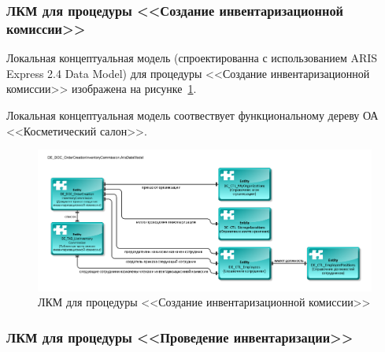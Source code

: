 \newpage

\subsubsection{ЛКМ для процедуры <<Создание инвентаризационной комиссии>>}

Локальная концептуальная модель
(спроектированна с использованием ARIS Express 2.4 \cite{ArisExpress} Data Model)
для процедуры <<Создание инвентаризационной комиссии>>
изображена на рисунке~\ref{fig:DE_DOC_OrderCreationInventoryCommission}.

Локальная концептуальная модель соотвествует функциональному дереву ОА <<Косметический салон>>.

\begin{figure}[!h]
    \centering

    \includegraphics[width=15cm]
    {assets/ARIS/DataModel/ConceptualModels/DE_DOC_OrderCreationInventoryCommission.ArisDataModel.pdf}

    \caption{ЛКМ для процедуры <<Создание инвентаризационной комиссии>>}

    \label{fig:DE_DOC_OrderCreationInventoryCommission}
\end{figure}






\subsubsection{ЛКМ для процедуры <<Проведение инвентаризации>>}

